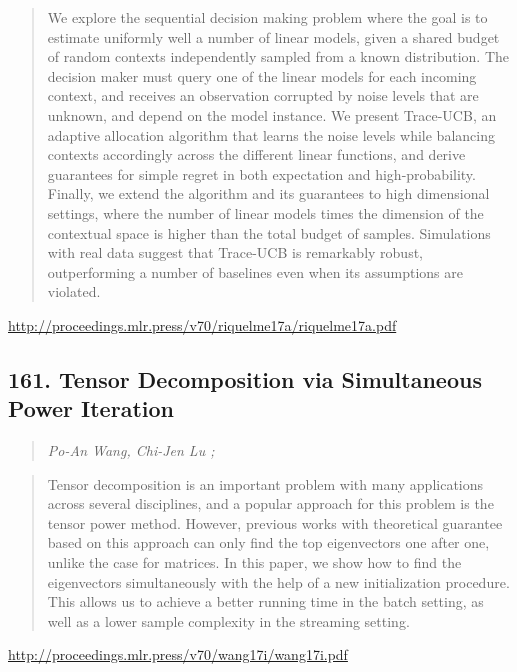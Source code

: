 \documentclass{article}
\begin{document}
\begin{quote}
    We explore the sequential decision making problem where the goal is to estimate uniformly well a number of linear models, given a shared budget of random contexts independently sampled from a known distribution. The decision maker must query one of the linear models for each incoming context, and receives an observation corrupted by noise levels that are unknown, and depend on the model instance. We present Trace-UCB, an adaptive allocation algorithm that learns the noise levels while balancing contexts accordingly across the different linear functions, and derive guarantees for simple regret in both expectation and high-probability. Finally, we extend the algorithm and its guarantees to high dimensional settings, where the number of linear models times the dimension of the contextual space is higher than the total budget of samples. Simulations with real data suggest that Trace-UCB is remarkably robust, outperforming a number of baselines even when its assumptions are violated.  
\end{quote}

\href{http://proceedings.mlr.press/v70/riquelme17a/riquelme17a.pdf}{http://proceedings.mlr.press/v70/riquelme17a/riquelme17a.pdf}

\subsection{161. Tensor Decomposition via Simultaneous Power Iteration}

\begin{quote}
\footnotesize{\textit{Po-An Wang, Chi-Jen Lu ;}}

\end{quote}

\begin{quote}
    Tensor decomposition is an important problem with many applications across several disciplines, and a popular approach for this problem is the tensor power method. However, previous works with theoretical guarantee based on this approach can only find the top eigenvectors one after one, unlike the case for matrices. In this paper, we show how to find the eigenvectors simultaneously with the help of a new initialization procedure. This allows us to achieve a better running time in the batch setting, as well as a lower sample complexity in the streaming setting.  
\end{quote}

\href{http://proceedings.mlr.press/v70/wang17i/wang17i.pdf}{http://proceedings.mlr.press/v70/wang17i/wang17i.pdf}
\end{document}
